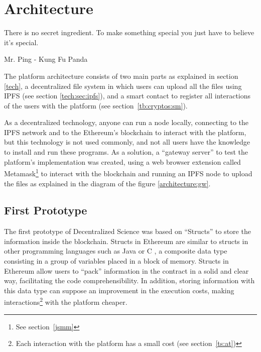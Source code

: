 

\chapter{Architecture}
\label{cha:architecture}
\begin{FraseCelebre}
  \begin{Frase}
    There is no secret ingredient. To make something special you just have to
    believe it's special.
  \end{Frase}
  \begin{Fuente}
    Mr. Ping - Kung Fu Panda
  \end{Fuente}
\end{FraseCelebre}

The platform architecture consists of two main parts as explained in section
\ref{tech}, a decentralized file system in which users can upload all the files
using IPFS (see section \ref{tech:sec:ipfs}), and a smart contact to register
all interactions of the users with the platform (see
section~\ref{tb:cryptos:sm}).

As a decentralized technology, anyone can run a node locally, connecting to the
IPFS network and to the Ethereum's blockchain to interact with the platform, but
this technology is not used commonly, and not all users have the knowledge to
install and run these programs. As a solution, a ``gateway server'' to test the
platform's implementation was created, using a web browser extension called
Metamask\footnote{See section~\ref{jsmm}} to interact with the blockchain and
running an IPFS node to upload the files as explained in the diagram of the
figure \ref{architecture:gw}.


\section{First Prototype}
\label{sec:first-prototype}

The first prototype of Decentralized Science was based on ``Structs'' to store
the information inside the blockchain. Structs in Ethereum are similar to
structs in other programming languages such as Java or C , a composite data type
consisting in a group of variables placed in a block of memory. Structs in
Ethereum allow users to ``pack'' information in the contract in a solid and
clear way, facilitating the code comprehensibility. In addition, storing
information with this data type can suppose an improvement in the execution
costs, making interactions\footnote{Each interaction with the platform has a
  small cost (see section~\ref{ts:at})} with the platform cheaper.

